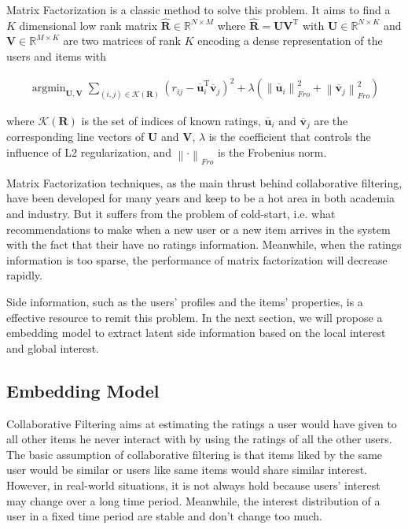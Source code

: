 \documentclass{sig-alternate-05-2015}
\DeclareMathOperator*{\argmin}{argmin}
\begin{document}
Matrix Factorization is a classic method to solve this problem.
It aims to find a $K$ dimensional low rank matrix $\mathbf{\hat{R}} \in \mathbb{R}^{N \times M}$
where $\mathbf{\hat{R}} = \mathbf{U} \mathbf{V}^\mathrm{T}$ with
$\mathbf{U} \in \mathbb{R}^{N \times K}$ and $\mathbf{V} \in \mathbb{R}^{M \times K}$
are two matrices of rank $K$ encoding a dense representation of the users and items with

\begin{equation}
\begin{aligned}
	\argmin_{\mathbf{U},\mathbf{V}}
	\sum_{(i,j) \in \mathcal{K}(\mathbf{R})}
	( r_{ij} - \overline{\mathbf{u}}_i^{\mathrm{T}} \overline{\mathbf{v}}_j ) ^ 2 +
	\lambda ( \left\| \overline{\mathbf{u}}_i \right\|_{Fro}^2 +
	\left\| \overline{\mathbf{v}}_j \right\|_{Fro}^2 )
\end{aligned}
\end{equation}

where $\mathcal{K}(\mathbf{R})$ is the set of indices of known ratings,
$\overline{\mathbf{u}}_i$ and $\overline{\mathbf{v}}_j$
are the corresponding line vectors of $\mathbf{U}$ and $\mathbf{V}$,
$\lambda$ is the coefficient that controls the influence of L2 regularization,
and $\left\| \cdot \right\|_{Fro}$ is the Frobenius norm.

Matrix Factorization techniques, as the main thrust behind collaborative filtering,
have been developed for many years and keep to be a hot area in both academia and industry.
But it suffers from the problem of cold-start,
i.e. what recommendations to make when a new user or a new item arrives in the system
with the fact that their have no ratings information.
Meanwhile, when the ratings information is too sparse,
the performance of matrix factorization will decrease rapidly.

Side information, such as the users' profiles and the items' properties,
is a effective resource to remit this problem.
In the next section, we will propose a embedding model
to extract latent side information based on the local interest and global interest.

\subsection{Embedding Model}
Collaborative Filtering aims at estimating the ratings
a user would have given to all other items he never interact with
by using the ratings of all the other users.
The basic assumption of collaborative filtering is that
items liked by the same user would be similar
or users like same items would share similar interest.
However, in real-world situations,
it is not always hold because users' interest may change over
a long time period.
Meanwhile, the interest distribution of a user in a fixed time period
are stable and don't change too much.
\end{document}
